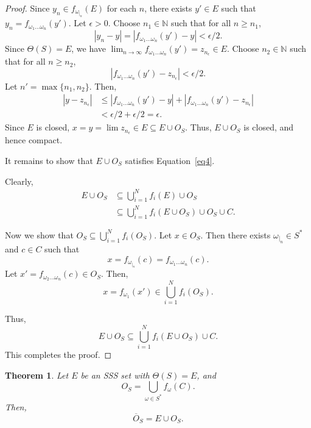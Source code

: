 \documentclass[12pt,oneside,reqno]{amsart}
\newtheorem{theorem}{Theorem}[section]
\theoremstyle{definition}
\theoremstyle{remark}
\begin{document}
\begin{proof}
Since $y_n \in f_{\omega_{|_n}}(E)$ for each $n$, there exists $y' \in E$ such that $y_n = f_{\omega_1 \ldots \omega_n}(y')$. Let $\epsilon > 0$. Choose $n_1 \in \mathbb{N}$ such that for all $n \geq n_1$,
\[
|y_n - y| = |f_{\omega_1 \ldots \omega_n}(y') - y| < \epsilon / 2.
\]
Since $\Theta(S) = E$, we have $\lim_{n \to \infty} f_{\omega_1 \ldots \omega_n}(y') = z_{n_\epsilon} \in E$. Choose $n_2 \in \mathbb{N}$ such that for all $n \geq n_2$,
\[
|f_{\omega_1 \ldots \omega_n}(y') - z_{n_\epsilon}| < \epsilon / 2.
\]
Let $n' = \max\{n_1, n_2\}$. Then,
\[
\begin{aligned}
|y - z_{n_\epsilon}| &\leq |f_{\omega_1 \ldots \omega_n}(y') - y| + |f_{\omega_1 \ldots \omega_n}(y') - z_{n_\epsilon}| \\
&< \epsilon / 2 + \epsilon / 2 = \epsilon.
\end{aligned}
\]
Since $E$ is closed, $x = y = \lim z_{n_\epsilon} \in E \subseteq E \cup O_S$. Thus, $E \cup O_S$ is closed, and hence compact.

It remains to show that $E \cup O_S$ satisfies Equation~\eqref{eq4}.

Clearly,
\[
\begin{aligned}
E \cup O_S &\subseteq \bigcup_{i=1}^N f_i(E) \cup O_S \\
&\subseteq \bigcup_{i=1}^N f_i(E \cup O_S) \cup O_S \cup C.
\end{aligned}
\]

Now we show that $O_S \subseteq \bigcup_{i=1}^N f_i(O_S)$. Let $x \in O_S$. Then there exists $\omega_{|_n} \in S^*$ and $c \in C$ such that
\[
x = f_{\omega_{|_n}}(c) = f_{\omega_1 \ldots \omega_n}(c).
\]
Let $x' = f_{\omega_2 \ldots \omega_n}(c) \in O_S$. Then,
\[
x = f_{\omega_1}(x') \in \bigcup_{i=1}^N f_i(O_S).
\]

Thus,
\[
E \cup O_S \subseteq \bigcup_{i=1}^N f_i(E \cup O_S) \cup C.
\]
This completes the proof.
\end{proof}


\begin{theorem}
Let $E$ be an SSS set with $\Theta(S) = E$, and
\[
O_S = \bigcup_{\omega \in S^*} f_{\omega}(C).
\]
Then,
\[
\overline{O}_S = E \cup O_S.
\]
\end{theorem}
\end{document}
